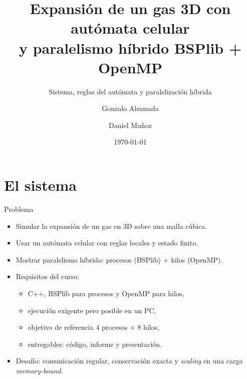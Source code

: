 \documentclass[aspectratio=169]{beamer}
\title[Gas 3D con LGA híbrido]{Expansión de un gas 3D con autómata celular\\y paralelismo híbrido BSPlib + OpenMP}
\subtitle{Sistema, reglas del autómata y paralelización híbrida}
\author[Ahumada, Muñoz]{Gonzalo Ahumada \and Daniel Muñoz}
\institute[USACH]{Laboratorio 2 --- High Performance Computing\\[1mm]
           Universidad de Santiago de Chile}
\date{\today}
\begin{document}
\begin{frame}
  \titlepage
\end{frame}

\section{El sistema}

\begin{frame}{Problema}
  \begin{itemize}
    \item Simular la \alert{expansión de un gas en 3D} sobre una malla cúbica.
    \item Usar un \alert{autómata celular} con reglas locales y estado finito.
    \item Mostrar \alert{paralelismo híbrido}: procesos (BSPlib) + hilos
          (OpenMP).
    \item Requisitos del curso:
      \begin{itemize}
        \item C++, BSPlib para procesos y OpenMP para hilos,
        \item ejecución exigente pero posible en un PC,
        \item objetivo de referencia $4$ procesos $\times$ $8$ hilos,
        \item entregables: código, informe y presentación.
      \end{itemize}
    \item Desafío: comunicación regular, conservación exacta y \emph{scaling}
          en una carga \emph{memory-bound}.
  \end{itemize}
\end{frame}
\end{document}
